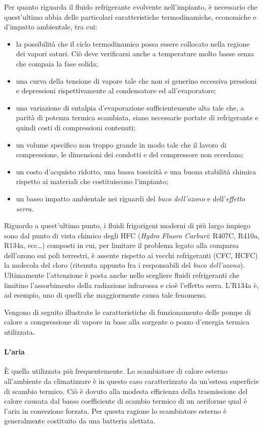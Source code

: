 Per quanto riguarda il fluido refrigerante evolvente nell'impianto, è necessario che quest'ultimo abbia delle particolari caratteristiche termodinamiche, economiche e d'impatto ambientale, tra cui:
\begin{itemize}
	\item la possibilità che il ciclo termodinamico possa essere collocato nella regione dei vapori saturi. Ciò deve verificarsi anche a temperature molto basse senza che compaia la fase solida;
	\item una curva della tensione di vapore tale che non si generino eccessiva pressioni e depressioni rispettivamente al condensatore ed all'evaporatore;
	\item una variazione di entalpia d'evaporazione sufficientemente alta tale che, a parità di potenza termica scambiata, siano necessarie portate di refrigerante e quindi costi di compressioni contenuti;
	\item un volume specifico non troppo grande in modo tale che il lavoro di compressione, le dimensioni dei condotti e del compressore non eccedano;
	\item un costo d'acquisto ridotto, una bassa tossicità e una buona stabilità chimica rispetto ai materiali che costituiscono l'impianto;
	\item un basso impatto ambientale nei riguardi del \emph{buco dell'ozono} e dell'\emph{effetto serra}.
\end{itemize}
Riguardo a quest'ultimo punto, i fluidi frigorigeni moderni di più largo impiego sono dal punto di vista chimico degli HFC (\emph{Hydro Fluoro Carburi}: R407C, R410a, R134a, ecc\dots) composti in cui, per limitare il problema legato alla comparsa dell'ozono sui poli terrestri, è assente rispetto ai vecchi refrigeranti (CFC, HCFC) la molecola del cloro (ritenuta appunto fra i responsabili del \emph{buco dell'ozono}). Ultimamente l'attenzione è posta anche nello scegliere fluidi refrigeranti che limitino l'assorbimento della radiazione infrarossa e cioè l'effetto serra. L'R134a è, ad esempio, uno di quelli che maggiormente causa tale fenomeno.

Vengono di seguito illustrate le caratteristiche di funzionamento delle pompe di calore a compressione di vapore in base alla sorgente o pozzo d'energia termica utilizzata.

\paragraph{L'aria}
È quella utilizzata più frequentemente. Lo scambiatore di calore esterno all'ambiente da climatizzare è in questo caso caratterizzato da un'estesa superficie di scambio termico. Ciò è dovuto alla modesta efficienza della trasmissione del calore causata dal basso coefficiente di scambio termico di un aeriforme qual è l'aria in convezione forzata. Per questa ragione lo scambiatore esterno è generalmente costituito da una batteria alettata. 

